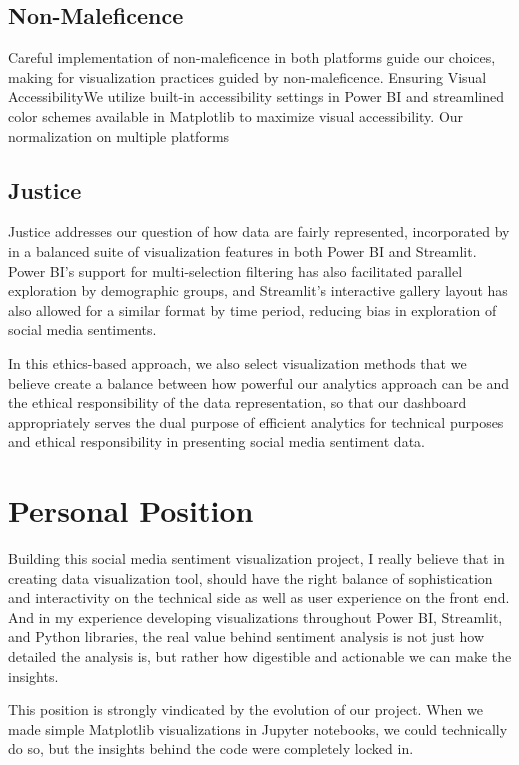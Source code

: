 \documentclass[conference]{IEEEtran}
\begin{document}
\subsection{Non-Maleficence}
Careful implementation of non-maleficence in both platforms guide our choices, making for visualization practices guided by non-maleficence. Ensuring Visual AccessibilityWe utilize built-in accessibility settings in Power BI and streamlined color schemes available in Matplotlib to maximize visual accessibility. Our normalization on multiple platforms

\subsection{Justice}
Justice addresses our question of how data are fairly represented, incorporated by in a balanced suite of visualization features in both Power BI and Streamlit. Power BI's support for multi-selection filtering has also facilitated parallel exploration by demographic groups, and Streamlit's interactive gallery layout has also allowed for a similar format by time period, reducing bias in exploration of social media sentiments.

In this ethics-based approach, we also select visualization methods that we believe create a balance between how powerful our analytics approach can be and the ethical responsibility of the data representation, so that our dashboard appropriately serves the dual purpose of efficient analytics for technical purposes and ethical responsibility in presenting social media sentiment data.

\section{Personal Position}

Building this social media sentiment visualization project, I really believe that in creating data visualization tool, should have the right balance of sophistication and interactivity on the technical side as well as user experience on the front end. And in my experience developing visualizations throughout Power BI, Streamlit, and Python libraries, the real value behind sentiment analysis is not just how detailed the analysis is, but rather how digestible and actionable we can make the insights.

This position is strongly vindicated by the evolution of our project. When we made simple Matplotlib visualizations in Jupyter notebooks, we could technically do so, but the insights behind the code were completely locked in.
\end{document}
